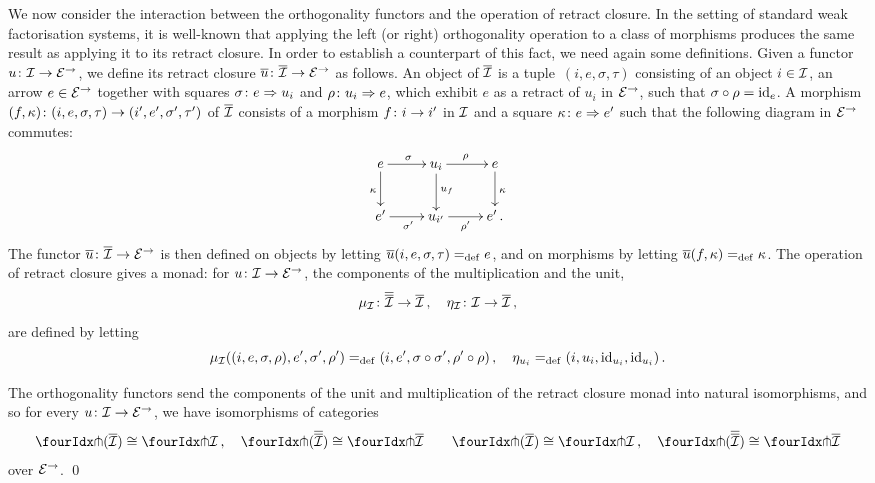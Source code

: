 \documentclass[reqno,10pt,a4paper,oneside]{amsart}
\begin{document}
We now consider the interaction between the orthogonality functors and the operation of retract closure. 
In the setting of standard weak factorisation systems, it is well-known that
applying the left (or right) orthogonality operation to a class of morphisms produces the same result as applying it to its retract closure. 
In order to establish a counterpart of this fact, we need again some definitions. 
Given a  functor $u \co \cal{I} \to \catE^{\to}$, we define its retract closure $\overline{u} \co \overline{\cal{I}} \to \catE^{\to}$ as follows. 
An object of $\overline{\cal{I}}$ is a tuple~$(i, e, \sigma, \tau)$ consisting of an object $i \in \cal{I}$, an arrow $e \in \cal{E}^\to$ together with squares $\sigma \co e \Rightarrow u_i$ and $\rho \co u_i \Rightarrow e$,
which exhibit $e$ as a retract of $u_i$ in  $\catE^{\to}$,  \ie such that $\sigma \cc \rho = \id_e$. 
A morphism $(f, \kappa) \co (i, e, \sigma, \tau) \to (i', e', \sigma', \tau')$ of $\overline{\cal{I}}$  consists of a morphism $f \co i \to i'$ in $\cal{I}$ and a square $\kappa \co e \Rightarrow e'$  such that the following diagram in $\cal{E}^\to$ commutes:
\[
\xymatrix{
  e
  \ar[r]^{\sigma}
    \ar[d]_{\kappa}
&
  u_i
  \ar[r]^{\rho}
  \ar[d]^{u_f}
&
  e
  \ar[d]^{\kappa}
\\
  e'
  \ar[r]_{\sigma'}
&
  u_{i'}
  \ar[r]_{\rho'}
&
  e' \, .
}
\]
The functor $\overline{u} \co \overline{\cal{I}} \to \catE^\to$ is then defined  on objects  by letting 
$\overline{u}(i, e, \sigma, \tau) \defeq e$,
and on morphisms by letting $\overline{u}(f, \kappa) \defeq \kappa$. The operation of retract closure gives a monad: for $u \co \cal{I} \to \catE^{\to}$,
the components of the multiplication and the unit, 
\[
\mu_\cal{I} \co \overline{\overline{\cal{I}}} \to \overline{\cal{I}} \, , \quad
\eta_\cal{I} \co \cal{I} \to \overline{\cal{I}} \, ,
\]
are defined by letting
\[
\mu_\cal{I}((i, e, \sigma,  \rho), e', \sigma', \rho') \defeq (i, e', \sigma \cc \sigma', \rho' \cc \rho) \, , \quad
\eta_{u_i} \defeq (i, u_i, \id_{u_i}, \id_{u_i}) \, .
\]




\begin{proposition}
\label{retract-closure}
The orthogonality functors send the components of the unit and multiplication of the retract closure monad into natural
isomorphisms, and so for every $u \co \cal{I} \to \catE^\to$, we have isomorphisms of categories
\begin{gather*} 
 \liftr{(\overline{\cal{I}})} \iso \liftr{\cal{I}} \, , \quad
 \liftr{(\overline{\overline{\cal{I}}})} \iso \liftr{\overline{\cal{I}}}  \qquad
 \liftl{(\overline{\cal{I}})} \iso \liftl{\cal{I}} \, , \quad
 \liftl{(\overline{\overline{\cal{I}}})} \iso \liftl{\overline{\cal{I}}}
\end{gather*} 
over $\catE^\to$. \qed
\end{proposition}
\end{document}
